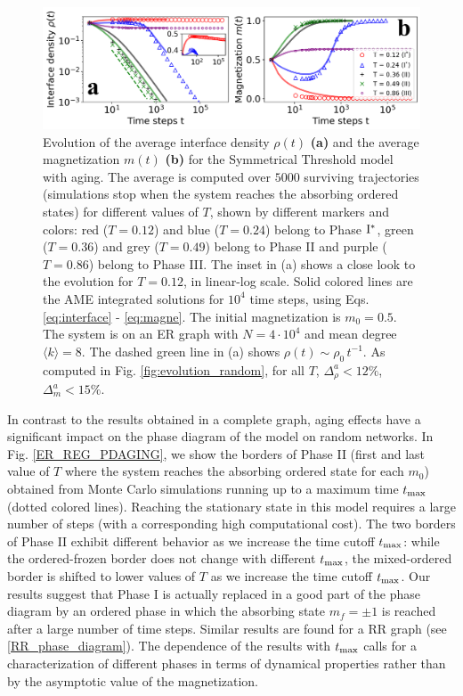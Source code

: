 \begin{figure}
        \centering \captionsetup{font=sf}
        \includegraphics[width=\textwidth]{Figs/Aging_STM/FIG6.pdf}
        \caption[Symmetrical threshold model with aging dynamics in random networks]{\label{fig:evolution_random_aging} Evolution of the average interface density $\rho(t)$ \textbf{(a)} and the average magnetization $m(t)$ \textbf{(b)} for the Symmetrical Threshold model with aging. The average is computed over $5000$ surviving trajectories (simulations stop when the system reaches the absorbing ordered states) for different values of $T$, shown by different markers and colors: red ($T = 0.12$) and blue ($T = 0.24$) belong to Phase ${\rm I}^{*}$, green ($T = 0.36$) and grey ($T = 0.49$) belong to Phase II and purple ($T = 0.86$) belong to Phase III. The inset in (a) shows a close look to the evolution for $T = 0.12$, in linear-log scale. Solid colored lines are the AME integrated solutions for $10^4$ time steps, using Eqs. \ref{eq:interface} - \ref{eq:magne}. The initial magnetization is $m_0 = 0.5$. The system is on an ER graph with $N = 4 \cdot 10^4$ and mean degree $\langle k \rangle = 8$. The dashed green line in (a) shows $\rho(t) \sim \rho_0 \, t^{-1}$.
        As computed in Fig. \ref{fig:evolution_random}, for all $T$, $\Delta^{a}_{\rho} < 12\%$, $\Delta^{a}_{m} < 15\%$.}
\end{figure}

In contrast to the results obtained in a complete graph, aging effects have a significant impact on the phase diagram of the model on random networks. In Fig. \ref{ER_REG_PDAGING}, we show the borders of Phase II (first and last value of $T$ where the system reaches the absorbing ordered state for each $m_0$) obtained from Monte Carlo simulations running up to a maximum time $t_{\rm max}$ (dotted colored lines). Reaching the stationary state in this model requires a large number of steps (with a corresponding high computational cost). The two borders of Phase II exhibit different behavior as we increase the time cutoff $t_{\rm max}$: while the ordered-frozen border does not change with different $t_{\rm max}$, the mixed-ordered border is shifted to lower values of $T$ as we increase the time cutoff $t_{\rm max}$. Our results suggest that Phase I is actually replaced in a good part of the phase diagram by an ordered phase in which the absorbing state $m_f = \pm 1$ is reached after a large number of time steps. Similar results are found for a RR graph (see \ref{RR_phase_diagram}). The dependence of the results with $t_{\rm max}$ calls for a characterization of different phases in terms of dynamical properties rather than by the asymptotic value of the magnetization.

